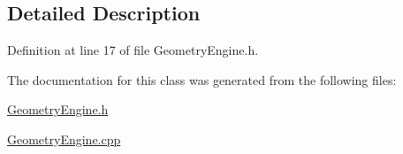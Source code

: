 \subsection{Detailed Description}


Definition at line 17 of file Geometry\+Engine.\+h.



The documentation for this class was generated from the following files\+:\begin{DoxyCompactItemize}
\item 
\hyperlink{_geometry_engine_8h}{Geometry\+Engine.\+h}\item 
\hyperlink{_geometry_engine_8cpp}{Geometry\+Engine.\+cpp}\end{DoxyCompactItemize}
